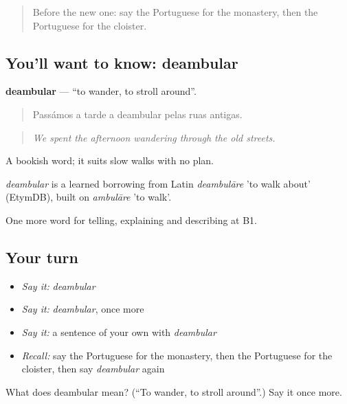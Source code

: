 \label{lesson:PT-C442-deambular}



\begin{quote}
Before the new one: say the Portuguese for the monastery, then the Portuguese for the cloister.
\end{quote}

\subsection*{You'll want to know: deambular}
\textbf{deambular} — \textquotedblleft{}to wander, to stroll around\textquotedblright{}.

\begin{quote}
Passámos a tarde a deambular pelas ruas antigas.
\end{quote}

\begin{quote}
\emph{We spent the afternoon wandering through the old streets.}
\end{quote}

A bookish word; it suits slow walks with no plan.

\begin{cousinweb}
\emph{deambular} is a learned borrowing from Latin \emph{deambulāre} 'to walk about' (EtymDB), built on \emph{ambulāre} 'to walk'.
\end{cousinweb}

\begin{grammarlens}[title={What you've built}]
One more word for telling, explaining and describing at B1.
\end{grammarlens}

\subsection*{Your turn}
\begin{itemize}
\raggedright
  \item \emph{Say it:} \emph{deambular}
  \item \emph{Say it:} \emph{deambular}, once more
  \item \emph{Say it:} a sentence of your own with \emph{deambular}
  \item \emph{Recall:} say the Portuguese for the monastery, then the Portuguese for the cloister, then say \emph{deambular} again
\end{itemize}

\begin{tcolorbox}[breakable,colback=teal!4,colframe=teal!35!black,title={Before you move on}]
What does deambular mean? (\textquotedblleft{}To wander, to stroll around\textquotedblright{}.) Say it once more.
\end{tcolorbox}
